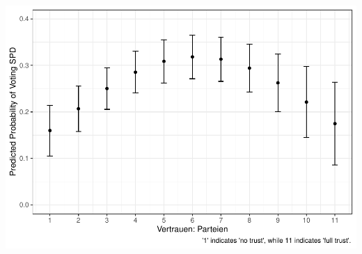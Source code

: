 \documentclass[
]{article}
\begin{document}
\includegraphics{AVCD_Final_Assignment-Edenhofer_files/figure-latex/spd-trust-parties-1.pdf}
\end{document}

